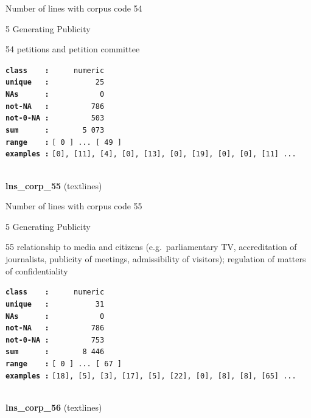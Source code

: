 \documentclass[]{article}
\begin{document}
Number of lines with corpus code 54

5 Generating Publicity

54 petitions and petition committee

\textbf{\texttt{class\ \ \ \ :}} \texttt{~~~~~numeric}\\
\textbf{\texttt{unique\ \ \ :}} \texttt{~~~~~~~~~~25}\\
\textbf{\texttt{NAs\ \ \ \ \ \ :}} \texttt{~~~~~~~~~~~0}\\
\textbf{\texttt{not-NA\ \ \ :}} \texttt{~~~~~~~~~786}\\
\textbf{\texttt{not-0-NA\ :}} \texttt{~~~~~~~~~503}\\
\textbf{\texttt{sum\ \ \ \ \ \ :}} \texttt{~~~~~~~5~073}\\
\textbf{\texttt{range\ \ \ \ :}}
\texttt{{[}\ 0\ {]}\ ...\ {[}\ 49\ {]}}\\
\textbf{\texttt{examples\ :}}
\texttt{{[}0{]},\ {[}11{]},\ {[}4{]},\ {[}0{]},\ {[}13{]},\ {[}0{]},\ {[}19{]},\ {[}0{]},\ {[}0{]},\ {[}11{]}\ ...}\\

~

\textbf{lns\_corp\_55} (textlines)

Number of lines with corpus code 55

5 Generating Publicity

55 relationship to media and citizens (e.g.~parliamentary TV,
accreditation of journalists, publicity of meetings, admissibility of
visitors); regulation of matters of confidentiality

\textbf{\texttt{class\ \ \ \ :}} \texttt{~~~~~numeric}\\
\textbf{\texttt{unique\ \ \ :}} \texttt{~~~~~~~~~~31}\\
\textbf{\texttt{NAs\ \ \ \ \ \ :}} \texttt{~~~~~~~~~~~0}\\
\textbf{\texttt{not-NA\ \ \ :}} \texttt{~~~~~~~~~786}\\
\textbf{\texttt{not-0-NA\ :}} \texttt{~~~~~~~~~753}\\
\textbf{\texttt{sum\ \ \ \ \ \ :}} \texttt{~~~~~~~8~446}\\
\textbf{\texttt{range\ \ \ \ :}}
\texttt{{[}\ 0\ {]}\ ...\ {[}\ 67\ {]}}\\
\textbf{\texttt{examples\ :}}
\texttt{{[}18{]},\ {[}5{]},\ {[}3{]},\ {[}17{]},\ {[}5{]},\ {[}22{]},\ {[}0{]},\ {[}8{]},\ {[}8{]},\ {[}65{]}\ ...}\\

~

\textbf{lns\_corp\_56} (textlines)
\end{document}
